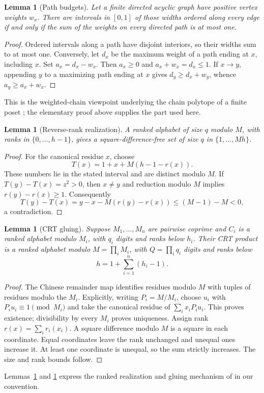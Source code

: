 \documentclass[11pt]{article}
\newtheorem{lemma}[theorem]{Lemma}
\theoremstyle{definition}
\theoremstyle{remark}
\begin{document}
\begin{lemma}[Path budgets]\label{lem:paths}
Let a finite directed acyclic graph have positive vertex weights $w_x$.
There are intervals in $[0,1]$ of those widths ordered along every edge
if and only if the sum of the weights on every directed path is at most one.
\end{lemma}
\begin{proof}
Ordered intervals along a path have disjoint interiors, so their widths
sum to at most one. Conversely, let $d_x$ be the maximum weight of a path
ending at $x$, including $x$. Set $a_x=d_x-w_x$. Then $a_x\ge0$ and
$a_x+w_x=d_x\le1$. If $x\to y$, appending $y$ to a maximizing path ending
at $x$ gives $d_y\ge d_x+w_y$, whence $a_y\ge a_x+w_x$.
\end{proof}
This is the weighted-chain viewpoint underlying the chain polytope of a
finite poset \cite{Stanley1986}; the elementary proof above supplies the
part used here.

\begin{lemma}[Reverse-rank realization]\label{lem:reverse}
A ranked alphabet of size $q$ modulo $M$, with ranks in
$\{0,\ldots,h-1\}$, gives a square-difference-free set of size $q$ in
$\{1,\ldots,Mh\}$.
\end{lemma}
\begin{proof}
For the canonical residue $x$, choose
\[
 T(x)=1+x+M(h-1-r(x)).
\]
These numbers lie in the stated interval and are distinct modulo $M$.
If $T(y)-T(x)=z^2>0$, then $x\ne y$ and reduction modulo $M$ implies
$r(y)-r(x)\ge1$. Consequently
\[
 T(y)-T(x)=y-x-M(r(y)-r(x))\le(M-1)-M<0,
\]
a contradiction.
\end{proof}

\begin{lemma}[CRT gluing]\label{lem:crt}
Suppose $M_1,\ldots,M_n$ are pairwise coprime and $C_i$ is a ranked
alphabet modulo $M_i$, with $q_i$ digits and ranks below $h_i$.
Their CRT product is a ranked alphabet modulo $M=\prod_iM_i$, with
$Q=\prod_iq_i$ digits and ranks below
\[
 h=1+\sum_{i=1}^n(h_i-1).
\]
\end{lemma}
\begin{proof}
The Chinese remainder map identifies residues modulo $M$ with tuples of
residues modulo the $M_i$. Explicitly, writing $P_i=M/M_i$, choose
$u_i$ with $P_iu_i\equiv1\pmod{M_i}$ and take the canonical residue of
$\sum_i x_iP_iu_i$. This proves existence; divisibility by every $M_i$
proves uniqueness. Assign rank $r(x)=\sum_ir_i(x_i)$. A square difference
modulo $M$ is a square in each coordinate. Equal coordinates leave the rank
unchanged and unequal ones increase it. At least one coordinate is unequal,
so the sum strictly increases. The size and rank bounds follow.
\end{proof}
Lemmas~\ref{lem:reverse} and \ref{lem:crt} express the ranked realization
and gluing mechanism of \cite[Lemmas 4--5]{Krachun2026} in our convention.
\end{document}
